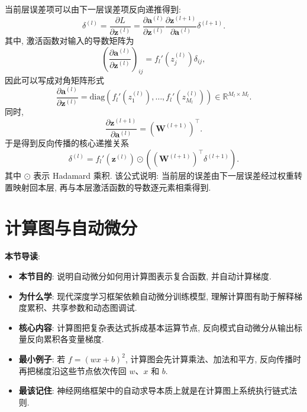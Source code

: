 \documentclass{../nndlcourse}
\begin{document}
当前层误差项可以由下一层误差项反向递推得到:
\begin{equation*}
    \delta^{(l)} = \frac{\partial L}{\partial \boldsymbol{z}^{(l)}} = \frac{\partial \boldsymbol{a}^{(l)}}{\partial \boldsymbol{z}^{(l)}} \frac{\partial \boldsymbol{z}^{(l+1)}}{\partial \boldsymbol{a}^{(l)}} \delta^{(l+1)}.
\end{equation*}
其中, 激活函数对输入的导数矩阵为
\begin{equation*}
    \left( \frac{\partial \boldsymbol{a}^{(l)}}{\partial \boldsymbol{z}^{(l)}} \right)_{ij} = f_l'\left(z_j^{(l)}\right)\delta_{ij},
\end{equation*}
因此可以写成对角矩阵形式
\begin{equation*}
    \frac{\partial \boldsymbol{a}^{(l)}}{\partial \boldsymbol{z}^{(l)}} = \mathrm{diag}\left(f_l'\left(z_1^{(l)}\right), \dots, f_l'\left(z_{M_l}^{(l)}\right)\right) \in \mathbb{R}^{M_l \times M_l}.
\end{equation*}
同时,
\begin{equation*}
    \frac{\partial \boldsymbol{z}^{(l+1)}}{\partial \boldsymbol{a}^{(l)}} = \left(\boldsymbol{W}^{(l+1)}\right)^\top.
\end{equation*}
于是得到反向传播的核心递推关系
\begin{equation*}
    \delta^{(l)} = f_l'\left(\boldsymbol{z}^{(l)}\right) \odot \left( \left(\boldsymbol{W}^{(l+1)}\right)^\top \delta^{(l+1)} \right).
\end{equation*}
其中 $\odot$ 表示 Hadamard 乘积. 该公式说明: 当前层的误差由下一层误差经过权重转置映射回本层, 再与本层激活函数的导数逐元素相乘得到. 


\section{计算图与自动微分}

\textbf{本节导读}:
\begin{itemize}
    \item \textbf{本节目的}: 说明自动微分如何用计算图表示复合函数, 并自动计算梯度.
    \item \textbf{为什么学}: 现代深度学习框架依赖自动微分训练模型, 理解计算图有助于解释梯度累积、共享参数和动态图调试.
    \item \textbf{核心内容}: 计算图把复杂表达式拆成基本运算节点, 反向模式自动微分从输出标量反向累积各变量梯度.
    \item \textbf{最小例子}: 若 $f={(wx+b)}^2$, 计算图会先计算乘法、加法和平方, 反向传播时再把梯度沿这些节点依次传回 $w$、$x$ 和 $b$.
    \item \textbf{最该记住}: 神经网络框架中的自动求导本质上就是在计算图上系统执行链式法则.
\end{itemize}
\end{document}
